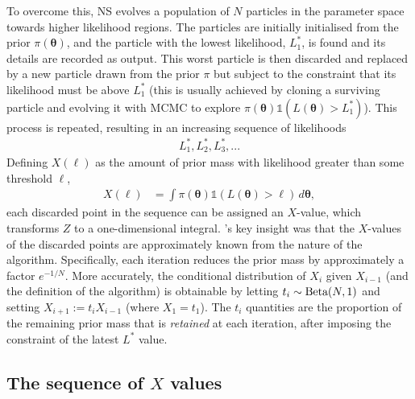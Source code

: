 \documentclass[entropy,article,accept,oneauthor,pdftex,10pt,a4paper]{mdpi}
\newcommand{\x}{\boldsymbol{\theta}}
\begin{document}
To overcome this, NS evolves a population of $N$ particles in the parameter
space towards higher likelihood regions.
The particles are initially initialised from the prior $\pi(\x)$, and the
particle with the lowest likelihood, $L^*_1$, is found and its details are
recorded as output. This worst particle is then discarded
and replaced by a new particle
drawn from the prior $\pi$ but subject to the constraint that its likelihood
must be above $L^*_1$ (this is usually achieved by cloning a surviving particle
and evolving it with MCMC to explore
$\pi(\x)\mathds{1}\left(L(\x) > L^*_1\right)$).
This process is repeated, resulting in an
increasing sequence of likelihoods
\begin{align}
L^*_1, L^*_2, L^*_3,... \label{eqn:likelihood_sequence}
\end{align}
Defining $X(\ell)$ as the amount of prior mass with likelihood greater than
some threshold $\ell$,
\begin{align}
X(\ell) &= \int \pi(\x) \mathds{1}\left(L(\x) > \ell\right) \, d\x,
\end{align}
each discarded point in the sequence can be assigned an $X$-value,
which transforms $Z$ to a one-dimensional integral.
\citet{skilling2006nested}'s key insight was that the
$X$-values of the discarded points are approximately known from the nature of the
algorithm. Specifically, each iteration reduces the prior mass by approximately
a factor $e^{-1/N}$. More accurately, the conditional distribution of
$X_{i}$ given $X_{i-1}$ (and the definition of the algorithm)
is obtainable by letting
$t_i \sim \textnormal{Beta}(N,1)$ and setting $X_{i+1} := t_iX_{i-1}$ (where
$X_1 = t_1$).
The $t_i$ quantities are the proportion of the remaining prior mass
that is {\em retained} at each iteration, after imposing the constraint of the
latest $L^*$ value.

\subsection{The sequence of $X$ values}
\end{document}
